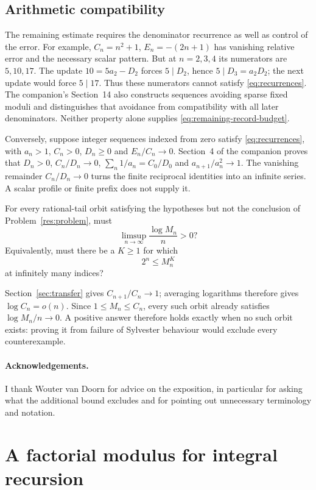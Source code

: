\documentclass[11pt]{article}
\begin{document}
\subsection{Arithmetic compatibility}\label{sec:scalar-limit}
The remaining estimate requires the denominator recurrence as well as
control of the error. For example, $C_n=n^2+1$, $E_n=-(2n+1)$ has vanishing
relative error and the necessary scalar pattern. But at $n=2,3,4$ its
numerators are $5,10,17$. The update $10=5a_2-D_2$ forces $5\mid D_2$,
hence $5\mid D_3=a_2D_2$; the next update would force $5\mid17$.
Thus these numerators cannot satisfy \eqref{eq:recurrences}. The companion's Section~14 also constructs
sequences avoiding sparse fixed moduli and distinguishes that avoidance
from compatibility with all later denominators. Neither property alone
supplies \eqref{eq:remaining-record-budget}.

Conversely, suppose integer sequences indexed from zero satisfy
\eqref{eq:recurrences}, with $a_n>1$, $C_n>0$, $D_n\ge0$ and
$E_n/C_n\to0$. Section~4 of the companion proves that $D_n>0$,
$C_n/D_n\to0$, $\sum_n1/a_n=C_0/D_0$ and $a_{n+1}/a_n^2\to1$.
The vanishing remainder $C_n/D_n\to0$ turns the finite reciprocal
identities into an infinite series. A scalar profile or finite prefix
does not supply it.

\begin{problem}\label{res:lcmheight}
For every rational-tail orbit satisfying the hypotheses but not the conclusion of Problem~\ref{res:problem},
must
\[
 \limsup_{n\to\infty}\frac{\log M_n}{n}>0?
\]
Equivalently, must there be a $K\ge1$ for which
\[
 2^n\le M_n^K
\]
at infinitely many indices?
\end{problem}
Section~\ref{sec:transfer} gives $C_{n+1}/C_n\to1$; averaging logarithms
therefore gives $\log C_n=o(n)$. Since $1\le M_n\le C_n$, every such
orbit already satisfies $\log M_n/n\to0$. A positive answer therefore
holds exactly when no such orbit exists: proving it from failure of
Sylvester behaviour would exclude every counterexample.

\paragraph{Acknowledgements.}
I thank Wouter van Doorn for advice on the exposition, in particular for
asking what the additional bound excludes and for pointing out unnecessary
terminology and notation.

\appendix
\section{A factorial modulus for integral recursion}\label{app:residue}
\end{document}
